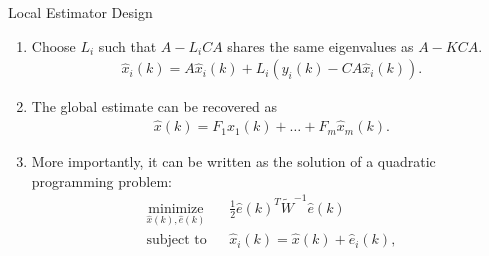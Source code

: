 \documentclass{beamer}
\begin{document}
\begin{frame}{Local Estimator Design}
\begin{enumerate}
\item  Choose $L_i$ such that $A-L_iCA$ shares the same eigenvalues as $A-KCA$.
\begin{align*}
\hat x_i(k) = A \hat x_i(k) + L_i (y_i(k)-CA\hat x_i(k)).
\end{align*}  
\item The global estimate can be recovered as
\begin{align*}
\hat x(k) = F_1\hat x_1(k)+\dots+F_m\hat x_m(k).
\end{align*}
\item More importantly, it can be written as the solution of a quadratic programming problem:
\begin{align*}
  &\mathop{\textrm{minimize}}\limits_{\hat x(k),\hat e(k)}&
  & \frac{1}{2}\hat e(k)^T \tilde W^{-1} \hat e(k)\\
  &\textrm{subject to} &
  &\hat x_i(k)  =  \hat x(k) + \hat e_i(k),&
\end{align*}
\end{enumerate}
\end{frame}
\end{document}

